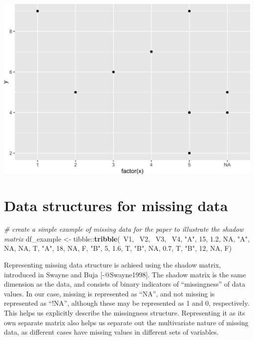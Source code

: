\documentclass[]{article}
\newenvironment{Shaded}{\begin{snugshade}}{\end{snugshade}}
\newcommand{\KeywordTok}[1]{\textcolor[rgb]{0.13,0.29,0.53}{\textbf{{#1}}}}
\newcommand{\DecValTok}[1]{\textcolor[rgb]{0.00,0.00,0.81}{{#1}}}
\newcommand{\FloatTok}[1]{\textcolor[rgb]{0.00,0.00,0.81}{{#1}}}
\newcommand{\StringTok}[1]{\textcolor[rgb]{0.31,0.60,0.02}{{#1}}}
\newcommand{\CommentTok}[1]{\textcolor[rgb]{0.56,0.35,0.01}{\textit{{#1}}}}
\newcommand{\OtherTok}[1]{\textcolor[rgb]{0.56,0.35,0.01}{{#1}}}
\newcommand{\NormalTok}[1]{{#1}}
\begin{document}
\includegraphics{jsm2017_files/figure-latex/ggplot-missing-vals-3.png}

\section{Data structures for missing
data}\label{data-structures-for-missing-data}

\begin{Shaded}
\begin{Highlighting}[]
\CommentTok{# create a simple example of missing data for the paper to illustrate the shadow matrix}
\NormalTok{df_example <-}\StringTok{  }\NormalTok{tibble::}\KeywordTok{tribble}\NormalTok{(~V1, ~V2, ~V3, ~V4,}
                               \StringTok{"A"}\NormalTok{, }\DecValTok{15}\NormalTok{, }\FloatTok{1.2}\NormalTok{, }\OtherTok{NA}\NormalTok{,}
                               \StringTok{"A"}\NormalTok{, }\OtherTok{NA}\NormalTok{, }\OtherTok{NA}\NormalTok{, T,}
                               \StringTok{"A"}\NormalTok{, }\DecValTok{18}\NormalTok{, }\OtherTok{NA}\NormalTok{, F,}
                               \StringTok{"B"}\NormalTok{, }\DecValTok{5}\NormalTok{, }\FloatTok{1.6}\NormalTok{, T,}
                               \StringTok{"B"}\NormalTok{, }\OtherTok{NA}\NormalTok{, }\FloatTok{0.7}\NormalTok{, T,}
                               \StringTok{"B"}\NormalTok{, }\DecValTok{12}\NormalTok{, }\OtherTok{NA}\NormalTok{, F)}
\end{Highlighting}
\end{Shaded}

Representing missing data structure is achieed using the shadow matrix,
introduced in Swayne and Buja {[}-@Swayne1998{]}. The shadow matrix is
the same dimension as the data, and consists of binary indicators of
``missingness'' of data values. In our case, missing is represented as
``NA'', and not missing is represented as ``!NA'', although these may be
represented as 1 and 0, respectively. This helps us explicitly describe
the missingness structure. Representing it as its own separate matrix
also helps us separate out the multivariate nature of missing data, as
different cases have missing values in different sets of variables.
\end{document}
